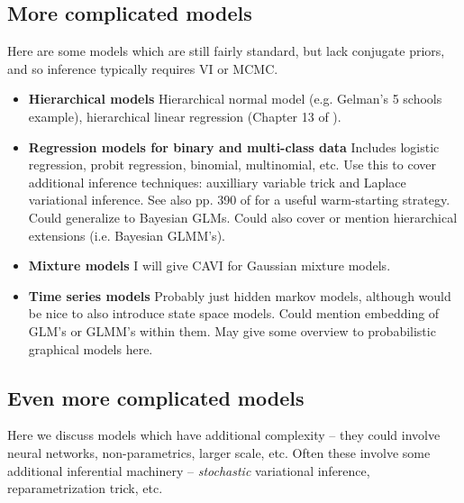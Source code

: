 \documentclass{article} %
\begin{document}
\subsection{More complicated models} \label{sec:more_complicated_models}

Here are some models which are still fairly standard,  but lack conjugate priors,  and so inference typically requires VI or MCMC.     

\begin{itemize}
\item \textbf{Hierarchical models}  Hierarchical normal model (e.g. Gelman's 5 schools example),  hierarchical linear regression (Chapter 13 of \cite{gelman2013bayesian}).
\item \textbf{Regression models for binary and multi-class data} Includes logistic regression, probit regression,  binomial,  multinomial,  etc.    Use this to cover additional inference techniques:  auxilliary variable trick and Laplace variational inference.      See also pp.  390 of \cite{hoff2009first} for a useful warm-starting strategy.   Could generalize to Bayesian GLMs.   Could also cover or mention hierarchical extensions (i.e.  Bayesian GLMM's). 
\item \textbf{Mixture models} I will give CAVI for Gaussian mixture models. 
\item \textbf{Time series models}  Probably just hidden markov models,  although would be nice to also introduce state space models.    Could mention embedding of GLM's or GLMM's within them.   May give some overview to probabilistic graphical models here.  
\end{itemize}

\subsection{Even more complicated models} 

Here we discuss models which have additional complexity -- they could involve neural networks,  non-parametrics,  larger scale,  etc.    Often these involve some additional inferential machinery -- \textit{stochastic} variational inference,  reparametrization trick,  etc.

\end{document}
